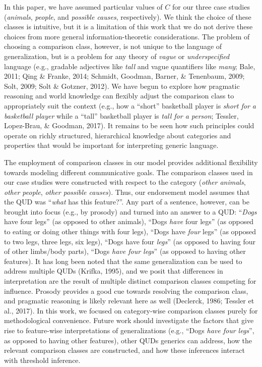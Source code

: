 \documentclass[english,,man,floatsintext]{apa6}
\theoremstyle{definition}
\theoremstyle{definition}
\theoremstyle{definition}
\theoremstyle{remark}
\begin{document}
In this paper, we have assumed particular values of \(C\) for our three
case studies (\emph{animals}, \emph{people}, and \emph{possible causes},
respectively). We think the choice of these classes is intuitive, but it
is a limitation of this work that we do not derive these choices from
more general information-theoretic considerations. The problem of
choosing a comparison class, however, is not unique to the language of
generalization, but is a problem for any theory of \emph{vague} or
\emph{underspecified} language (e.g., gradable adjectives like
\emph{tall} and vague quantifiers like \emph{many}; Bale, 2011; Qing \&
Franke, 2014; Schmidt, Goodman, Barner, \& Tenenbaum, 2009; Solt, 2009;
Solt \& Gotzner, 2012). We have begun to explore how pragmatic reasoning
and world knowledge can flexibly adjust the comparison class to
appropriately suit the context (e.g., how a ``short'' basketball player
is \emph{short for a basketball player} while a ``tall'' basketball
player is \emph{tall for a person}; Tessler, Lopez-Brau, \& Goodman,
2017). It remains to be seen how such principles could operate on richly
structured, hierarchical knowledge about categories and properties that
would be important for interpreting generic language.

The employment of comparison classes in our model provides additional
flexibility towards modeling different communicative goals. The
comparison classes used in our case studies were constructed with
respect to the category (\emph{other animals}, \emph{other people},
\emph{other possible causes}). Thus, our endorsement model assumes that
the QUD was \enquote{\emph{what} has this feature?}. Any part of a
sentence, however, can be brought into focus (e.g., by prosody) and
turned into an answer to a QUD: \enquote{\emph{Dogs} have four legs} (as
opposed to other animals), \enquote{Dogs \emph{have} four legs} (as
opposed to eating or doing other things with four legs), \enquote{Dogs
have \emph{four} legs} (as opposed to two legs, three legs, six legs),
\enquote{Dogs have four \emph{legs}} (as opposed to having four of other
limbs/body parts), \enquote{Dogs \emph{have four legs}} (as opposed to
having other features). It has long been noted that the same
generalization can be used to address multiple QUDs (Krifka, 1995), and
we posit that differences in interpretation are the result of multiple
distinct comparison classes competing for influence. Prosody provides a
good cue towards resolving the comparison class, and pragmatic reasoning
is likely relevant here as well (Declerck, 1986; Tessler et al., 2017).
In this work, we focused on category-wise comparison classes purely for
methodological convenience. Future work should investigate the factors
that give rise to feature-wise interpretations of generalizations (e.g.,
\enquote{Dogs \emph{have four legs}}, as opposed to having other
features), other QUDs generics can address, how the relevant comparison
classes are constructed, and how these inferences interact with
threshold inference.
\end{document}
